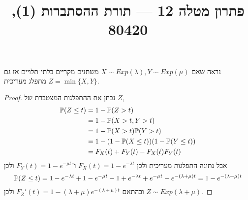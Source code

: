 
\title{פתרון מטלה 12 --- תורת ההסתברות (1), 80420}

\DeclareMathOperator{\Supp}{Supp}


\maketitle
\maketitleprint{}

\question{}
נראה שאם $X \sim Exp(\lambda), Y \sim Exp(\mu)$ משתנים מקריים בלתי־תלויים אז גם $Z = \min\{ X, Y \}$ מתפלג מעריכית.
\begin{proof}
	נבחן את ההתפלגות המצטברת של $Z$,
	\begin{align*}
		\mathbb{P}(Z \le t)
		& = 1 - \mathbb{P}(Z > t) \\
		& = 1 - \mathbb{P}(X > t, Y > t) \\
		& = 1 - \mathbb{P}(X > t) \mathbb{P}(Y > t) \\
		& = 1 - (1 - \mathbb{P}(X \le t))(1 - \mathbb{P}(Y \le t)) \\
		& = F_X(t) + F_Y(t) - F_X(t) F_Y(t)
	\end{align*}
	אבל נתונה התפלגות מעריכית ולכן $F_X(t) = 1 - e^{-\lambda t}$ ו־$F_Y(t) = 1 - e^{-\mu t}$ ולכן
	\[
		\mathbb{P}(Z \le t)
		= 1 - e^{-\lambda t} + 1 - e^{-\mu t} - 1 + e^{-\lambda t} + e^{-\mu t} - e^{-(\lambda + \mu)t}
		= 1 - e^{-(\lambda + \mu)t}
	\]
	ובהתאם $F_Z'(t) = 1 - (\lambda + \mu)e^{-(\lambda + \mu)t}$ ולכן $Z \sim Exp(\lambda + \mu)$.
\end{proof}

